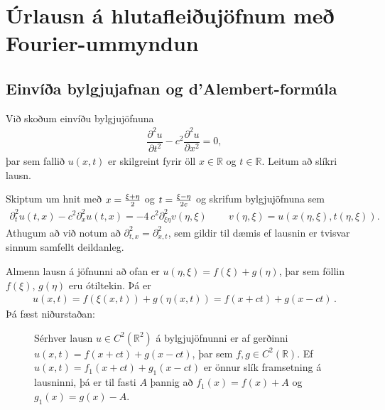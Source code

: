\documentclass[a4paper,10pt,icelandic]{sphinxmanual}
\begin{document}
\section{Úrlausn á hlutafleiðujöfnum með Fourier-ummyndun}
\label{\detokenize{Kafli04:urlausn-a-hlutafleiujofnum-me-fourier-ummyndun}}

\subsection{Einvíða bylgjujafnan og d’Alembert-formúla}
\label{\detokenize{Kafli04:einvia-bylgjujafnan-og-d-alembert-formula}}
Við skoðum einvíðu bylgjujöfnuna
\begin{equation*}
\begin{split}\dfrac{\partial^2u}{\partial t^2}
-c^2\dfrac{\partial^2u}{\partial x^2}=0,\end{split}
\end{equation*}
þar sem fallið \(u(x,t)\) er skilgreint fyrir öll \(x \in \mathbb{R}\) og \(t \in \mathbb{R}\).
Leitum að slíkri lausn.

Skiptum um hnit með \(x = {\xi+\eta\over 2}\) og \(t = {\xi-\eta\over 2 c}\) og skrifum bylgjujöfnuna sem
\begin{equation*}
\begin{split}\partial^2_{t} u(t,x)- c^2 \partial^2_x u (t,x)= -4 \,c^2 \partial^2_{\xi\eta} v(\eta,\xi)\, \qquad v(\eta,\xi) = u(x(\eta,\xi),t(\eta,\xi)).\end{split}
\end{equation*}
Athugum að við notum að \(\partial^2_{t,x}=\partial^2_{x,t}\), sem gildir til dæmis ef lausnin er tvisvar sinnum samfellt deildanleg.

Almenn lausn á jöfnunni að ofan er \(u(\eta, \xi)=f(\xi)+g(\eta)\), þar sem föllin \(f(\xi)\), \(g(\eta)\) eru ótiltekin. Þá er
\begin{equation*}
\begin{split}u(x,t)=f(\xi(x,t))+g(\eta(x,t))= f(x+ct)+g(x-ct)\,.\end{split}
\end{equation*}
Þá fæst niðurstaðan:
\begin{description}
\item[{}] \leavevmode
Sérhver lausn \(u\in C^2({{\mathbb R}}^2)\) á bylgjujöfnunni er af gerðinni \(u(x,t)=f(x+ct)+g(x-ct)\), þar sem \(f,g\in C^2({{\mathbb R}})\).
Ef \(u(x,t)=f_1(x+ct)+g_1(x-ct)\) er önnur slík framsetning á lausninni, þá er til fasti \(A\) þannig að \(f_1(x)=f(x)+A\) og \(g_1(x)=g(x)-A\).

\end{description}
\end{document}
